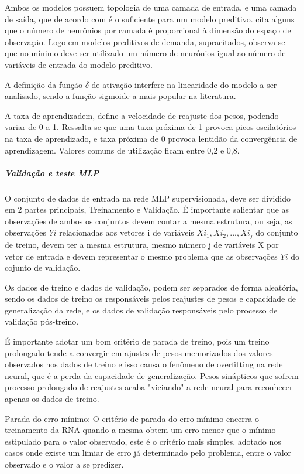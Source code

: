 \documentclass[	12pt, Times, openright, twoside, a4paper, english, brazil]{abntex2}
\begin{document}
          Ambos os modelos possuem topologia de uma camada de entrada, e uma camada de saída, que de acordo com \cite{Cybenko1988} é o suficiente para um modelo preditivo.
          \cite{Flavia2014} cita alguns que o número de neurônios por camada é proporcional à dimensão do espaço de observação. Logo em modelos preditivos de demanda, supracitados, observa-se que no mínimo deve ser utilizado um número de neurônios igual ao número de variáveis de entrada do modelo preditivo.
          
          A definição da função $\delta$ de ativação interfere na linearidade  do modelo a ser analisado, sendo a função sigmoide a mais popular na literatura. 
          
          A taxa de aprendizadem, define a velocidade de reajuste dos pesos, podendo variar de 0 a 1. Ressalta-se que uma taxa próxima de 1 provoca picos oscilatórios na taxa de aprendizado, e taxa próxima de 0 provoca lentidão da convergência de aprendizagem. Valores comuns de utilização ficam entre 0,2 e 0,8.
          
          \subparagraph{Validação e teste MLP}
          	O conjunto de dados de entrada na rede MLP supervisionada, deve ser dividido em 2 partes principais, Treinamento e Validação.
          	É importante salientar que as observações de ambos os conjuntos devem contar a mesma estrutura, ou seja, as observações $Yi$ relacionadas aos vetores i de variáveis $Xi_1,Xi_2,...,Xi_j$ do conjunto de treino, devem ter a mesma estrutura, mesmo número j de variáveis X por vetor de entrada e devem representar o mesmo problema que as observações $Yi$ do cojunto de validação.
          	
          	Os dados de treino e dados de validação, podem ser separados de forma aleatória, sendo os dados de treino os responsáveis pelos reajustes de pesos e capacidade de generalização da rede, e os dados de validação responsáveis pelo processo de validação pós-treino.
          	
          	É importante adotar um bom critério de parada de treino, pois um treino prolongado tende a convergir em ajustes de pesos memorizados dos valores observados nos dados de treino e isso causa o fenômeno de overfitting na rede neural, que é a perda da capacidade de generalização. Pesos sinápticos que sofrem processo prolongado de reajustes acaba "viciando" a rede neural para reconhecer apenas os dados de treino.
          	
          	Parada do erro mínimo:
          	O critério de parada do erro mínimo encerra o treinamento da RNA quando a mesma obtem um erro menor que o mínimo estipulado para o valor observado, este é o critério mais simples, adotado nos casos onde existe um limiar de erro já determinado pelo problema, entre o valor observado e o valor a se predizer.
          	
\end{document}
